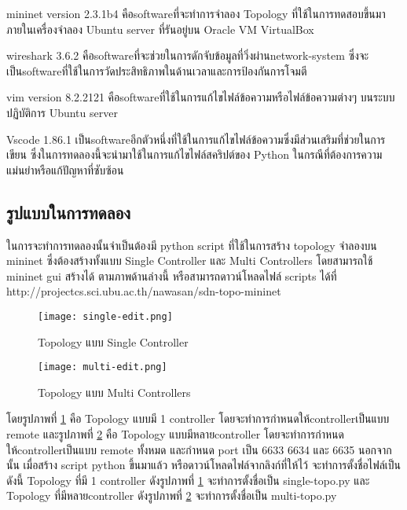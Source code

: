 mininet version 2.3.1b4
คือ\gls{software}ที่จะทำการจำลอง Topology ที่ใช้ในการทดสอบขึ้นมาภายในเครื่องจำลอง Ubuntu server ที่รันอยู่บน Oracle VM VirtualBox

wireshark 3.6.2
คือ\gls{software}ที่จะช่วยในการดักจับข้อมูลที่วิ่งผ่าน\gls{network-system} ซึ่งจะเป็น\gls{software}ที่ใช้ในการวัดประสิทธิภาพในด้านเวลาและการป้องกันการโจมตี

vim version 8.2.2121
คือ\gls{software}ที่ใช้ในการแก้ไขไฟล์ข้อความหรือไฟล์ข้อความต่างๆ บนระบบปฏิบัติการ Ubuntu server

Vscode 1.86.1
เป็น\gls{software}อีกตัวหนึ่งที่ใช้ในการแก้ไขไฟล์ข้อความซึ่งมีส่วนเสริมที่ช่วยในการเขียน ซึ่งในการทดลองนี้จะนำมาใช้ในการแก้ไขไฟล์สคริปต์ของ Python ในกรณีที่ต้องการความแม่นยำหรือแก้ปัญหาที่ซับซ้อน
\newline
\subsection{รูปแบบในการทดลอง}
\indent\indent
ในการจะทำการทดลองนั้นจำเป็นต้องมี python script ที่ใช้ในการสร้าง topology จำลองบน mininet
ซึ่งต้องสร้างทั้งแบบ Single Controller และ Multi Controllers โดยสามารถใช้ mininet gui สร้างได้ ตามภาพด้านล่างนี้
หรือสามารถดาวน์โหลดไฟล์ scripts ได้ที่ http://projectcs.sci.ubu.ac.th/nawasan/sdn-topo-mininet
\\

\begin{figure}[h!]
    \centering
    \texttt{[image: single-edit.png]}
    \caption{Topology แบบ Single Controller}
    \label{img:topo_cs}
\end{figure}

\begin{figure}[h!]
    \centering
    \texttt{[image: multi-edit.png]}
    \caption{Topology แบบ Multi Controllers}
    \label{img:topo_cm}
\end{figure}

\pagebreak

โดยรูปภาพที่ \ref{img:topo_cs} คือ Topology แบบมี 1 \gls{controller} โดยจะทำการกำหนดให้\gls{controller}เป็นแบบ remote 
และรูปภาพที่ \ref{img:topo_cm} คือ Topology แบบมีหลาย\gls{controller} โดยจะทำการกำหนดให้\gls{controller}เป็นแบบ remote ทั้งหมด และกำหนด port เป็น 6633 6634 และ 6635
นอกจากนั้น เมื่อสร้าง script python ขึ้นมาแล้ว หรือดาวน์โหลดไฟล์จากลิงก์ที่ให้ไว้ จะทำการตั้งชื่อไฟล์เป็นดังนี้ Topology ที่มี 1 \gls{controller}
ดังรูปภาพที่ \ref{img:topo_cs} จะทำการตั้งชื่อเป็น single-topo.py และ Topology ที่มีหลาย\gls{controller} ดังรูปภาพที่ \ref{img:topo_cm} จะทำการตั้งชื่อเป็น multi-topo.py

